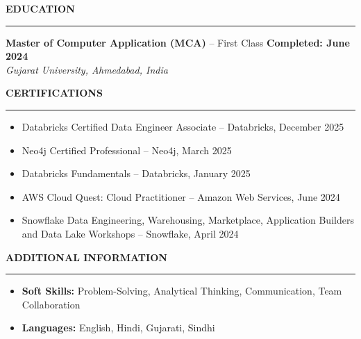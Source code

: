 \documentclass[11pt,a4paper]{article}
\begin{document}
\vspace{0.2cm}

\noindent\textbf{\large EDUCATION}
\vspace{0.1cm}
\hrule
\vspace{0.2cm}

\noindent\textbf{Master of Computer Application (MCA)} – First Class \hfill \textbf{Completed: June 2024} \\
\textit{Gujarat University, Ahmedabad, India}



\vspace{0.2cm}

\noindent\textbf{\large CERTIFICATIONS}
\vspace{0.1cm}
\hrule
\vspace{0.15cm}
\begin{itemize}[leftmargin=*]
  \item Databricks Certified Data Engineer Associate – Databricks, December 2025
  \item Neo4j Certified Professional – Neo4j, March 2025
  \item Databricks Fundamentals – Databricks, January 2025
  \item AWS Cloud Quest: Cloud Practitioner – Amazon Web Services, June 2024
  \item Snowflake Data Engineering, Warehousing, Marketplace, Application Builders and Data Lake Workshops – Snowflake, April 2024
\end{itemize}

\vspace{0.2cm}

\noindent\textbf{\large ADDITIONAL INFORMATION}
\vspace{0.1cm}
\hrule
\vspace{0.15cm}
\begin{itemize}[leftmargin=*]
  \item \textbf{Soft Skills:} Problem-Solving, Analytical Thinking, Communication, Team Collaboration
  \item \textbf{Languages:} English, Hindi, Gujarati, Sindhi
\end{itemize}
\end{document}
